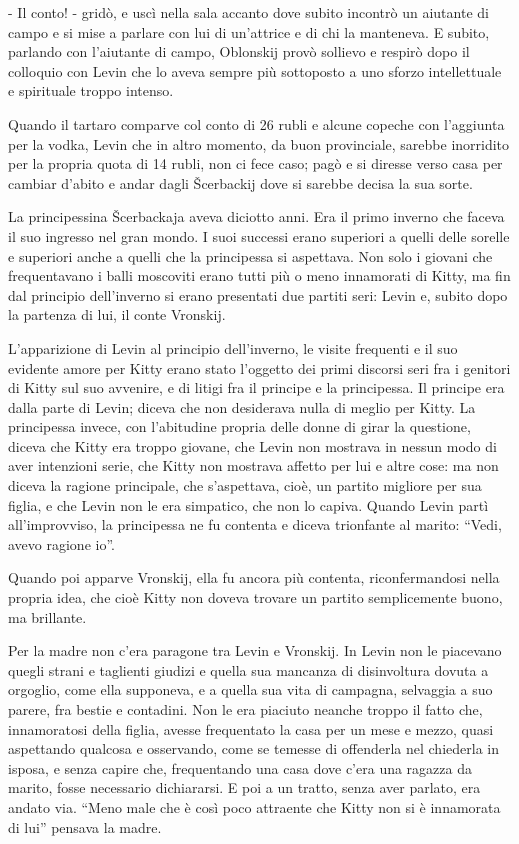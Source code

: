 - Il conto! - gridò, e uscì nella sala accanto dove subito incontrò un aiutante di campo e si mise a parlare con lui di un'attrice e di chi la manteneva. E subito, parlando con l'aiutante di campo, Oblonskij provò sollievo e respirò dopo il colloquio con Levin che lo aveva sempre più sottoposto a uno sforzo intellettuale e spirituale troppo intenso. 

Quando il tartaro comparve col conto di 26 rubli e alcune copeche con l'aggiunta per la vodka, Levin che in altro momento, da buon provinciale, sarebbe inorridito per la propria quota di 14 rubli, non ci fece caso; pagò e si diresse verso casa per cambiar d'abito e andar dagli Šcerbackij dove si sarebbe decisa la sua sorte. 

\label{xii} 

La principessina Šcerbackaja aveva diciotto anni. Era il primo inverno che faceva il suo ingresso nel gran mondo. I suoi successi erano superiori a quelli delle sorelle e superiori anche a quelli che la principessa si aspettava. Non solo i giovani che frequentavano i balli moscoviti erano tutti più o meno innamorati di Kitty, ma fin dal principio dell'inverno si erano presentati due partiti seri: Levin e, subito dopo la partenza di lui, il conte Vronskij. 

L'apparizione di Levin al principio dell'inverno, le visite frequenti e il suo evidente amore per Kitty erano stato l'oggetto dei primi discorsi seri fra i genitori di Kitty sul suo avvenire, e di litigi fra il principe e la principessa. Il principe era dalla parte di Levin; diceva che non desiderava nulla di meglio per Kitty. La principessa invece, con l'abitudine propria delle donne di girar la questione, diceva che Kitty era troppo giovane, che Levin non mostrava in nessun modo di aver intenzioni serie, che Kitty non mostrava affetto per lui e altre cose: ma non diceva la ragione principale, che s'aspettava, cioè, un partito migliore per sua figlia, e che Levin non le era simpatico, che non lo capiva. Quando Levin partì all'improvviso, la principessa ne fu contenta e diceva trionfante al marito: ``Vedi, avevo ragione io''. 

Quando poi apparve Vronskij, ella fu ancora più contenta, riconfermandosi nella propria idea, che cioè Kitty non doveva trovare un partito semplicemente buono, ma brillante. 

Per la madre non c'era paragone tra Levin e Vronskij. In Levin non le piacevano quegli strani e taglienti giudizi e quella sua mancanza di disinvoltura dovuta a orgoglio, come ella supponeva, e a quella sua vita di campagna, selvaggia a suo parere, fra bestie e contadini. Non le era piaciuto neanche troppo il fatto che, innamoratosi della figlia, avesse frequentato la casa per un mese e mezzo, quasi aspettando qualcosa e osservando, come se temesse di offenderla nel chiederla in isposa, e senza capire che, frequentando una casa dove c'era una ragazza da marito, fosse necessario dichiararsi. E poi a un tratto, senza aver parlato, era andato via. ``Meno male che è così poco attraente che Kitty non si è innamorata di lui'' pensava la madre. 

